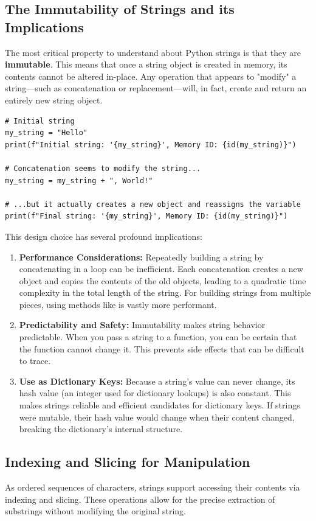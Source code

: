 \subsection{The Immutability of Strings and its Implications}
\label{subsec:string_immutability}
The most critical property to understand about Python strings is that they are \textbf{immutable}. This means that once a string object is created in memory, its contents cannot be altered in-place. Any operation that appears to "modify" a string—such as concatenation or replacement—will, in fact, create and return an entirely new string object.

\text{ }\begin{verbatim}
# Initial string
my_string = "Hello"
print(f"Initial string: '{my_string}', Memory ID: {id(my_string)}")

# Concatenation seems to modify the string...
my_string = my_string + ", World!"

# ...but it actually creates a new object and reassigns the variable
print(f"Final string: '{my_string}', Memory ID: {id(my_string)}")
\end{verbatim}

This design choice has several profound implications:
\begin{enumerate}
    \item \textbf{Performance Considerations:} Repeatedly building a string by concatenating in a loop can be inefficient. Each concatenation creates a new object and copies the contents of the old objects, leading to a quadratic time complexity in the total length of the string. For building strings from multiple pieces, using methods like  is vastly more performant.
    \item \textbf{Predictability and Safety:} Immutability makes string behavior predictable. When you pass a string to a function, you can be certain that the function cannot change it. This prevents side effects that can be difficult to trace.
    \item \textbf{Use as Dictionary Keys:} Because a string's value can never change, its hash value (an integer used for dictionary lookups) is also constant. This makes strings reliable and efficient candidates for dictionary keys. If strings were mutable, their hash value would change when their content changed, breaking the dictionary's internal structure.
\end{enumerate}

\subsection{Indexing and Slicing for Manipulation}
\label{subsec:string_indexing_slicing}
As ordered sequences of characters, strings support accessing their contents via indexing and slicing. These operations allow for the precise extraction of substrings without modifying the original string.

